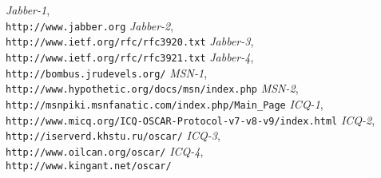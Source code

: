 \begin{thebibliography}{9999}
 {\sl Jabber-1},\\
{\tt http://www.jabber.org}
 {\sl Jabber-2},\\
{\tt http://www.ietf.org/rfc/rfc3920.txt}
 {\sl Jabber-3},\\
{\tt http://www.ietf.org/rfc/rfc3921.txt}
 {\sl Jabber-4},\\
{\tt http://bombus.jrudevels.org/}
 {\sl MSN-1},\\
{\tt http://www.hypothetic.org/docs/msn/index.php}
 {\sl MSN-2},\\
{\tt http://msnpiki.msnfanatic.com/index.php/Main_Page}
 {\sl ICQ-1},\\
{\tt http://www.micq.org/ICQ-OSCAR-Protocol-v7-v8-v9/index.html}
 {\sl ICQ-2},\\
{\tt http://iserverd.khstu.ru/oscar/}
 {\sl ICQ-3},\\
{\tt http://www.oilcan.org/oscar/}
 {\sl ICQ-4},\\
{\tt http://www.kingant.net/oscar/}
\end{thebibliography}
